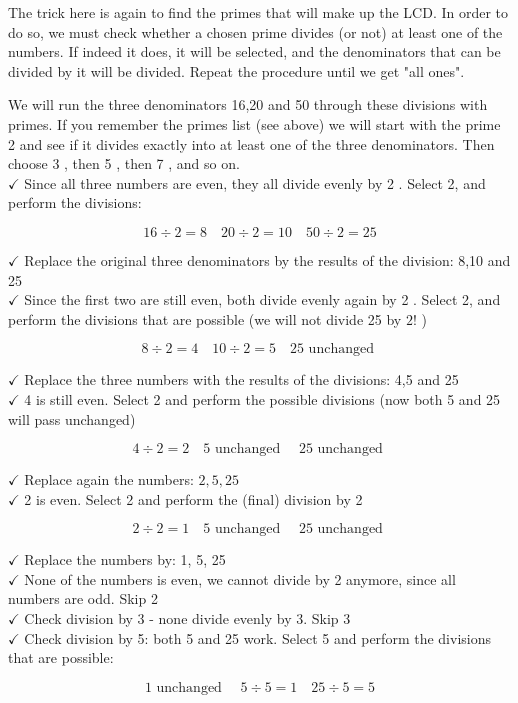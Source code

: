 \documentclass{ximera}
\begin{document}
The trick here is again to find the primes that will make up the LCD. In order to do so, we must check whether a chosen prime divides (or not) at least one of the numbers. If indeed it does, it will be selected, and the denominators that can be divided by it will be divided. Repeat the procedure until we get "all ones".

We will run the three denominators 16,20 and 50 through these divisions with primes. If you remember the primes list (see above) we will start with the prime 2 and see if it divides exactly into at least one of the three denominators. Then choose 3 , then 5 , then 7 , and so on.\\
$\checkmark$ Since all three numbers are even, they all divide evenly by 2 . Select 2, and perform the divisions:

$$16 \div 2=8 \quad 20 \div 2=10 \quad 50 \div 2=25$$

$\checkmark$ Replace the original three denominators by the results of the division: 8,10 and 25\\
$\checkmark$ Since the first two are still even, both divide evenly again by 2 . Select 2, and perform the divisions that are possible (we will not divide 25 by $2!$ )

$$8 \div 2=4 \quad 10 \div 2=5 \quad 25 \text { unchanged }$$

$\checkmark$ Replace the three numbers with the results of the divisions: 4,5 and 25\\
$\checkmark$ 4 is still even. Select 2 and perform the possible divisions (now both 5 and 25 will pass unchanged)

$$4 \div 2=2 \quad 5 \text { unchanged } \quad 25 \text { unchanged }$$

$\checkmark$ Replace again the numbers: $2,5,25$\\
$\checkmark$ 2 is even. Select 2 and perform the (final) division by 2

$$2 \div 2=1 \quad 5 \text { unchanged } \quad 25 \text { unchanged }$$

$\checkmark$ Replace the numbers by: 1, 5, 25\\
$\checkmark$ None of the numbers is even, we cannot divide by 2 anymore, since all numbers are odd. Skip 2\\
$\checkmark$ Check division by 3 - none divide evenly by 3. Skip 3\\
$\checkmark$ Check division by 5: both 5 and 25 work. Select 5 and perform the divisions that are possible:

$$1 \text { unchanged } \quad 5 \div 5=1 \quad 25 \div 5=5$$
\end{document}

